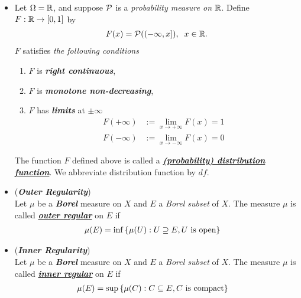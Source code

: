 \documentclass[11pt]{article}
\begin{document}
\begin{itemize}
\item \begin{definition}
Let $\Omega = {\mathbb R}$, and suppose ${\mathcal P}$ is a \emph{probability measure on ${\mathbb R}$}. Define $F: {\mathbb R} \rightarrow [0, 1]$ by
\begin{align*}
F(x) = {\mathcal P}((-\infty, x]), \;\; x \in {\mathbb R}.
\end{align*} $F$ satisfies \emph{the following conditions}
\begin{enumerate}
\item $F$ is \emph{\textbf{right continuous}},
\item $F$ is \emph{\textbf{monotone non-decreasing}},
\item $F$ has \emph{\textbf{limits}} at $\pm \infty$
\begin{align*}
F(+\infty) &:= \lim\limits_{x\rightarrow +\infty} F(x) = 1\\
F(-\infty) &:= \lim\limits_{x\rightarrow -\infty} F(x) = 0
\end{align*}
\end{enumerate}
The function $F$ defined above is called a \underline{\emph{\textbf{(probability) distribution function}}}. We abbreviate distribution function by $df$.
\end{definition}

\item \begin{definition} (\emph{\textbf{Outer Regularity}}) \citep{folland2013real} \\
Let $\mu$ be a \textbf{\emph{Borel}} measure on $X$ and $E$ a \emph{Borel subset} of $X$. The measure $\mu$ is called \underline{\textbf{\emph{outer regular}}} on $E$  if
\begin{align*}
\mu(E) &= \inf\left\{\mu(U): U \supseteq E, U \text{ is open}\right\}
\end{align*}
\end{definition}

\item \begin{definition} (\emph{\textbf{Inner Regularity}}) \citep{folland2013real} \\
Let $\mu$ be a \textbf{\emph{Borel}} measure on $X$ and $E$ a \emph{Borel subset} of $X$. The measure $\mu$ is called \underline{\textbf{\emph{inner regular}}} on $E$  if
\begin{align*}
\mu(E) &= \sup\left\{\mu(C): C \subseteq E, C \text{ is compact}\right\}
\end{align*}
\end{definition}


\end{itemize}
\end{document}
